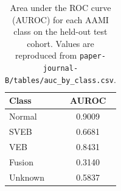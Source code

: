 \begin{table}[t]
  \centering
\caption{Area under the ROC curve (AUROC) for each AAMI class on the held-out test cohort. Values are reproduced from \texttt{paper-journal-B/tables/auc\_by\_class.csv}.}
  \label{tab:auc-by-class}
  \begin{tabular}{lc}
    \toprule
    Class & AUROC \\
    \midrule
    Normal & 0.9009 \\
    SVEB   & 0.6681 \\
    VEB    & 0.8431 \\
    Fusion & 0.3140 \\
    Unknown & 0.5837 \\
    \bottomrule
  \end{tabular}
\end{table}

